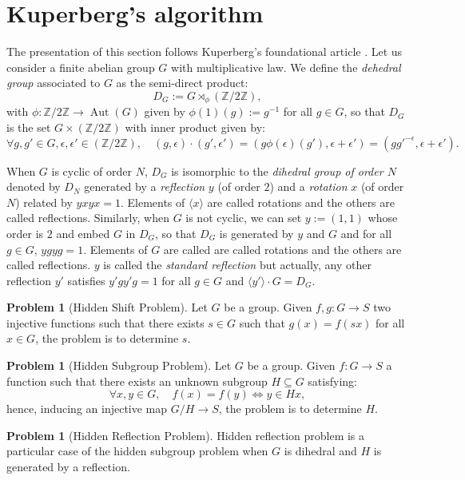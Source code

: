 \documentclass[a4paper,10pt,notitlepage]{report}
\theoremstyle{definition}
\theoremstyle{plain}
\theoremstyle{definition}
\newtheorem{Problem}[Definition]{Problem}
\newcommand{\Z}{\mathbb{Z}}
\renewcommand{\(}{\left(}
\renewcommand{\)}{\right)}
\DeclareMathOperator{\Aut}{Aut}
\begin{document}
\section{Kuperberg's algorithm}\label{Paragraph 14}

The presentation of this section follows Kuperberg's foundational article \cite{Kuperberg}. Let us consider a finite abelian group $G$ with multiplicative law. We define the \emph{dehedral group} associated to $G$ as the semi-direct product:
\[D_G:=G\rtimes_\phi (\Z/2\Z),\]
with $\phi: \Z/2\Z\longrightarrow \Aut(G)$ given by $\phi(1)(g):=g^{-1}$ for all $g\in G$, so that $D_G$ is the set $G\times(\Z/2\Z)$ with inner product given by:
\[\forall g,g'\in G, \epsilon,\epsilon'\in(\Z/2\Z), \quad (g,\epsilon)\cdot(g',\epsilon')=(g\phi(\epsilon)(g'),\epsilon+\epsilon')=(gg'^{-\epsilon},\epsilon+\epsilon').\]

When $G$ is cyclic of order $N$, $D_G$ is isomorphic to the \emph{dihedral group of order $N$} denoted by $D_N$ generated by a \emph{reflection} $y$ (of order $2$) and a \emph{rotation} $x$ (of order $N$) related by $yxyx=1$.  Elements of $\langle x\rangle$ are called rotations and the others are called reflections. Similarly, when $G$ is not cyclic, we can set $y:=(1,1)$ whose order is $2$ and embed $G$ in $D_G$, so that $D_G$ is generated by $y$ and $G$ and for all $g\in G$, $ygyg=1$. Elements of $G$ are called are called rotations and the others are called reflections. $y$ is called the \emph{standard reflection} but actually, any other reflection $y'$ satisfies $y'gy'g=1$ for all $g\in G$ and $\langle y'\rangle\cdot G=D_G$. 

\begin{Problem}[Hidden Shift Problem]
Let $G$ be a group. Given $f,g: G\longrightarrow S$ two injective functions such that there exists $s\in G$ such that $g(x)=f(sx)$ for all $x\in G$, the problem is to determine $s$.
\end{Problem}

\begin{Problem}[Hidden Subgroup Problem]
Let $G$ be a group. Given $f: G\longrightarrow S$ a function such that there exists an unknown subgroup $H\subseteq G$ satisfying:
\[\forall x,y\in G, \quad f(x)=f(y)\Longleftrightarrow y\in Hx,\]
hence, inducing an injective map $G/H\longrightarrow S$, the problem is to determine $H$.
\end{Problem}

\begin{Problem}[Hidden Reflection Problem]
Hidden reflection problem is a particular case of the hidden subgroup problem when $G$ is dihedral and $H$ is generated by a reflection.
\end{Problem}
\end{document}
